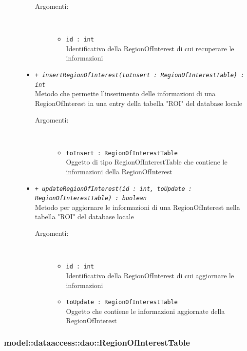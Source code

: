 \documentclass[../DefinizioneDiProdotto.tex]{subfiles}
\begin{document}
\begin{description}
\begin{itemize}
\begin{description}
\item[Argomenti:] \
\begin{itemize}
\item \texttt{id : int}\\
Identificativo della RegionOfInterest di cui recuperare le informazioni\end{itemize}
\end{description}
\item \texttt{+ \textit{insertRegionOfInterest(toInsert : RegionOfInterestTable) : int}}\\
Metodo che permette l'inserimento delle informazioni di una RegionOfInterest in una entry della tabella "ROI" del database locale
 \begin{description}
\item[Argomenti:] \
\begin{itemize}
\item \texttt{toInsert : RegionOfInterestTable}\\
Oggetto di tipo RegionOfInterestTable che contiene le informazioni della RegionOfInterest\end{itemize}
\end{description}
\item \texttt{+ \textit{updateRegionOfInterest(id : int, toUpdate : RegionOfInterestTable) : boolean}}\\
Metodo per aggiornare le informazioni di una RegionOfInterest nella tabella "ROI" del database locale
 \begin{description}
\item[Argomenti:] \
\begin{itemize}
\item \texttt{id : int}\\
Identificativo della RegionOfInterest di cui aggiornare le informazioni\item \texttt{toUpdate : RegionOfInterestTable}\\
Oggetto che contiene le informazioni aggiornate della RegionOfInterest\end{itemize}
\end{description}
\end{itemize}
\end{description}

\subsubsection{model::dataaccess::dao::RegionOfInterestTable}
\end{document}
